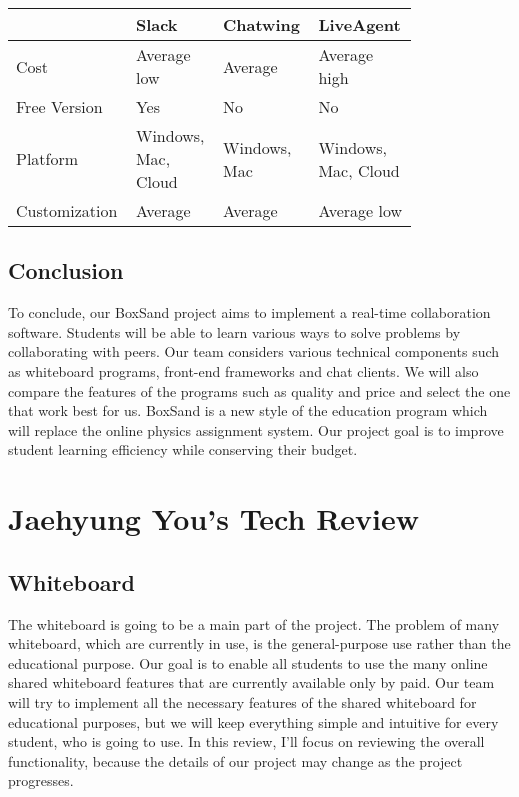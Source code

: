 \documentclass[10pt]{article}
\begin{document}
            \begin{tabular}{ | p{0.2\linewidth} | p{0.2\linewidth} | p{0.2\linewidth} | p{0.2\linewidth} | } \hline
                 & Slack & Chatwing & LiveAgent \\ \hline
                Cost & Average low & Average & Average high \\ \hline
                Free Version & Yes & No & No \\ \hline
                Platform & Windows, Mac, Cloud & Windows, Mac & Windows, Mac, Cloud \\ \hline
                Customization & Average & Average & Average low \\ \hline
            \end{tabular}
         
        \subsection{Conclusion} 
            To conclude, our BoxSand project aims to implement a real-time collaboration software. Students will be able to learn various ways to solve problems by collaborating with peers. Our team considers various technical components such as whiteboard programs, front-end frameworks and chat clients. We will also compare the features of the programs such as quality and price and select the one that work best for us. BoxSand is a new style of the education program which will replace the online physics assignment system. Our project goal is to improve student learning efficiency while conserving their budget.

    \clearpage
    \section{Jaehyung You's Tech Review}
        \subsection{Whiteboard}
            The whiteboard is going to be a main part of the project. The problem of many whiteboard, which are currently in use, is the general-purpose use rather than the educational purpose. Our goal is to enable all students to use the many online shared whiteboard features that are currently available only by paid. Our team will try to implement all the necessary features of the shared whiteboard for educational purposes, but we will keep everything simple and intuitive for every student, who is going to use. In this review, I’ll focus on reviewing the overall functionality, because the details of our project may change as the project progresses.
            
\end{document}
